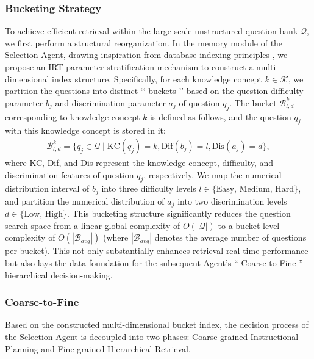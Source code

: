 \subsubsection{Bucketing Strategy}
To achieve efficient retrieval within the large-scale unstructured question bank $\mathcal{Q}$, we first perform a structural reorganization. In the memory module of the Selection Agent, drawing inspiration from database indexing principles \cite{douze2025faiss}, we propose an IRT parameter stratification mechanism to construct a multi-dimensional index structure. Specifically, for each knowledge concept $k \in \mathcal{K}$, we partition the questions into distinct ‘‘ buckets ’’ based on the question difficulty parameter $b_j$ and discrimination parameter $a_j$ of question $q_j$. The bucket $\mathcal{B}^{k}_{l,d}$ corresponding to knowledge concept $k$ is defined as follows, and the question $q_j$ with this knowledge concept is stored in it:
\begin{align}
    \mathcal{B}_{l,d}^k = \{ q_j \in \mathcal{Q} \mid \text{KC}(q_j) = k, \text{Dif}(b_j) = l, \text{Dis}(a_j) = d \},
\end{align}
where KC, Dif, and Dis represent the knowledge concept, difficulty, and discrimination features of question $q_j$, respectively. We map the numerical distribution interval of $b_j$ into three difficulty levels $l \in \{\text{Easy, Medium, Hard}\}$, and partition the numerical distribution of $a_j$ into two discrimination levels $d \in \{\text{Low, High}\}$. This bucketing structure significantly reduces the question search space from a linear global complexity of $O(|\mathcal{Q}|)$ to a bucket-level complexity of $O(|\mathcal{B}_{avg}|)$ (where $|\mathcal{B}_{avg}|$ denotes the average number of questions per bucket). This not only substantially enhances retrieval real-time performance but also lays the data foundation for the subsequent Agent's “ Coarse-to-Fine ”  hierarchical decision-making.






\subsubsection{Coarse-to-Fine}
Based on the constructed multi-dimensional bucket index, the decision process of the Selection Agent is decoupled into two phases: Coarse-grained Instructional Planning and Fine-grained Hierarchical Retrieval.

